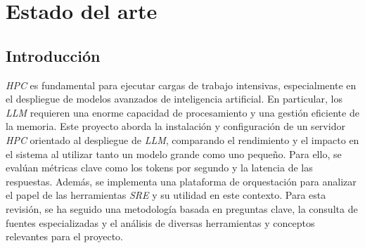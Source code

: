 \chapter{Estado del arte}

\section{Introducción}


\textit{HPC} es fundamental para ejecutar cargas de trabajo intensivas, especialmente en el despliegue de modelos avanzados de inteligencia artificial. En particular, los \textit{LLM} requieren una enorme capacidad de procesamiento y una gestión eficiente de la memoria. Este proyecto aborda la instalación y configuración de un servidor \textit{HPC} orientado al despliegue de \textit{LLM}, comparando el rendimiento y el impacto en el sistema al utilizar tanto un modelo grande como uno pequeño. Para ello, se evalúan métricas clave como los tokens por segundo y la latencia de las respuestas. Además, se implementa una plataforma de orquestación para analizar el papel de las herramientas \textit{SRE} y su utilidad en este contexto.
Para esta revisión, se ha seguido una metodología basada en preguntas clave, la consulta de fuentes especializadas y el análisis de diversas herramientas y conceptos relevantes para el proyecto.


